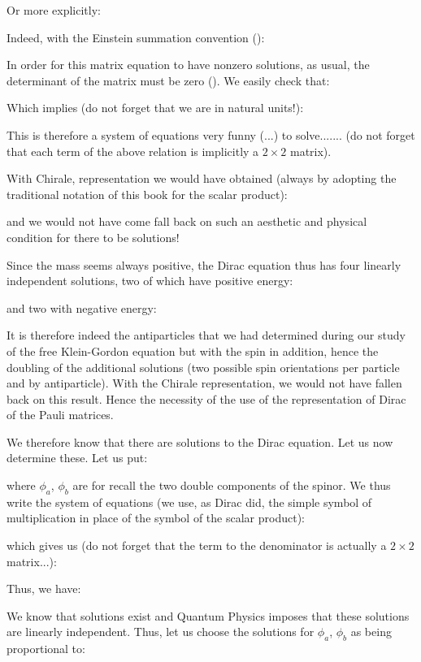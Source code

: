 	Or more explicitly:
	
	Indeed, with the Einstein summation convention ():
	
	In order for this matrix equation to have nonzero solutions, as usual, the determinant of the matrix must be zero (). We easily check that:
	
	Which implies (do not forget that we are in natural units!):
	
	This is therefore a system of equations very funny (...) to solve....... (do not forget that each term of the above relation is implicitly a $2\times 2$ matrix).
	
	With Chirale, representation we would have obtained (always by adopting the traditional notation of this book for the scalar product):
	
	and we would not have come fall back on such an aesthetic and physical condition for there to be solutions!

Since the mass seems always positive, the Dirac equation thus has four linearly independent solutions, two of which have positive energy:
	
	and two with negative energy:
	
	It is therefore indeed the antiparticles that we had determined during our study of the free Klein-Gordon equation but with the spin in addition, hence the doubling of the additional solutions (two possible spin orientations per particle and by antiparticle). With the Chirale representation, we would not have fallen back on this result. Hence the necessity of the use of the representation of Dirac of the Pauli matrices.

We therefore know that there are solutions to the Dirac equation. Let us now determine these. Let us put:
	
	where $\phi_a$, $\phi_b$ are for recall the two double components of the spinor. We thus write the system of equations (we use, as Dirac did, the simple symbol of multiplication in place of the symbol of the scalar product):
	
	which gives us (do not forget that the term to the denominator is actually a $2\times 2$ matrix...):
	
	Thus, we have:
	
	We know that solutions exist and Quantum Physics imposes that these solutions are linearly independent. Thus, let us choose the solutions for $\phi_a$, $\phi_b$ as being proportional to:
	
